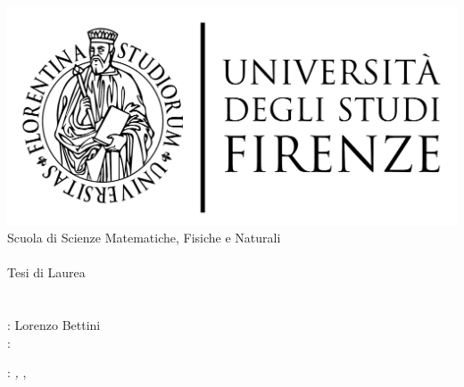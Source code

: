 \newcommand{\myFaculty}{
	Scuola di Scienze Matematiche, Fisiche e Naturali\xspace}
\newcommand{\myUni}{\protect{
	Università degli Studi di Firenze}\xspace}

\begin{titlepage}
	\begin{center}
   	\large
      \hfill
      \vfill
      \begingroup
         \includegraphics[scale=0.15]{logo/LOGO}\\
			\myFaculty \\
			\myDegree \\ 
			\vspace{0.5cm}
         \vspace{0.5cm}    
         Tesi di Laurea    
         \vspace{0.5cm}    
      \endgroup 
      \vfill 
      \begingroup
      	\color{Maroon} \\ $\ $\\
      	\spacedallcaps{\myEnglishTitle} \\ 	
	\bigskip
	\bigskip
      \endgroup
      \spacedlowsmallcaps{\myName}
      \vfill 
      \vfill
      \mySupervisorTitle: Lorenzo Bettini\\
      \vfill
      \ifx\myCoSupervisorTitle\undefined
      \else
	 \myCoSupervisorTitle: \myCoSupervisorName\\
      \fi
	\bigskip
	\bigskip
      \vfill
      \vfill
      \vfill
      \vfill
      \vfill
      \vfill
      \vfill
      \vfill
      \myTime
	\end{center}        
\end{titlepage}   
   \newpage
	\thispagestyle{empty}
	\hfill
	\vfill
	\noindent\myName: 
	\textit{\myItalianTitle,} 
	\myDegree, \textcopyright\ \myTime
